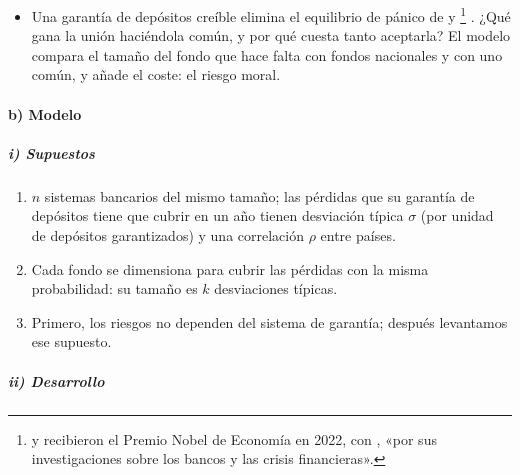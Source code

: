 \documentclass[11pt]{article}
\begin{document}
\begin{itemize}
\item Una garantía de depósitos creíble elimina el equilibrio de pánico de  y \footnote{ y  recibieron el Premio Nobel de Economía en 2022, con , «por sus investigaciones sobre los bancos y las crisis financieras»\nocite{Nobel2022}.} . ¿Qué gana la unión haciéndola común, y por qué cuesta tanto aceptarla? El modelo compara el tamaño del fondo que hace falta con fondos nacionales y con uno común, y añade el coste: el riesgo moral\nocite{DiamondDybvig1983Bank}.
\end{itemize}

\paragraph{b) Modelo}

\subparagraph{i) Supuestos}

\begin{enumerate}
\item $n$ sistemas bancarios del mismo tamaño; las pérdidas que su garantía de depósitos tiene que cubrir en un año tienen desviación típica $\sigma$ (por unidad de depósitos garantizados) y una correlación $\rho$ entre países.
\item Cada fondo se dimensiona para cubrir las pérdidas con la misma probabilidad: su tamaño es $k$ desviaciones típicas.
\item Primero, los riesgos no dependen del sistema de garantía; después levantamos ese supuesto.
\end{enumerate}

\subparagraph{ii) Desarrollo}
\end{document}
